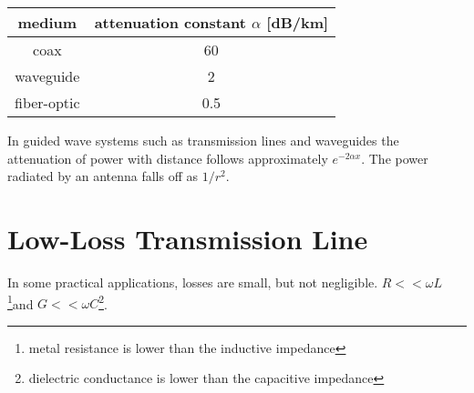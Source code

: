\documentclass{ximera}
\begin{document}
\begin{center}
\begin{tabular}{|c|c|} \hline
medium     & attenuation constant $\alpha$ [dB/km]     \\  \hline       
coax        & 60                                 \\ \hline
 waveguide  & 2  \\ \hline          
fiber-optic &  0.5  \\ \hline
\end{tabular}
\end{center}


In guided wave systems such as transmission lines and waveguides the attenuation of power with distance follows approximately $e^{-2\alpha x}$. The power radiated by an antenna falls off as $1/r^{2}$.

\section{Low-Loss Transmission Line}








In some practical applications, losses are small, but not negligible.  $R<< \omega L$ \footnote{metal resistance is
lower than the inductive impedance}and $G <<  \omega C$\footnote{dielectric conductance is lower than the capacitive impedance}. 
\end{document}
